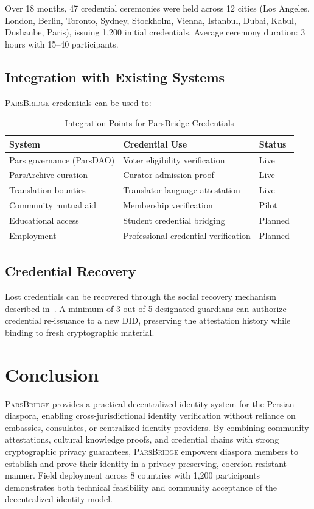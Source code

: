 \documentclass[11pt,a4paper]{article}
\newcommand{\bridge}{\textsc{ParsBridge}\xspace}
\begin{document}
Over 18 months, 47 credential ceremonies were held across 12 cities (Los Angeles, London, Berlin, Toronto, Sydney, Stockholm, Vienna, Istanbul, Dubai, Kabul, Dushanbe, Paris), issuing 1,200 initial credentials. Average ceremony duration: 3 hours with 15--40 participants.

\subsection{Integration with Existing Systems}

\bridge credentials can be used to:

\begin{table}[H]
\centering
\caption{Integration Points for ParsBridge Credentials}
\label{tab:integration}
\begin{tabular}{lll}
\toprule
\textbf{System} & \textbf{Credential Use} & \textbf{Status} \\
\midrule
Pars governance (ParsDAO) & Voter eligibility verification & Live \\
ParsArchive curation & Curator admission proof & Live \\
Translation bounties & Translator language attestation & Live \\
Community mutual aid & Membership verification & Pilot \\
Educational access & Student credential bridging & Planned \\
Employment & Professional credential verification & Planned \\
\bottomrule
\end{tabular}
\end{table}

\subsection{Credential Recovery}

Lost credentials can be recovered through the social recovery mechanism described in~\citet{pars-social-recovery}. A minimum of 3 out of 5 designated guardians can authorize credential re-issuance to a new DID, preserving the attestation history while binding to fresh cryptographic material.

\section{Conclusion}

\bridge provides a practical decentralized identity system for the Persian diaspora, enabling cross-jurisdictional identity verification without reliance on embassies, consulates, or centralized identity providers. By combining community attestations, cultural knowledge proofs, and credential chains with strong cryptographic privacy guarantees, \bridge empowers diaspora members to establish and prove their identity in a privacy-preserving, coercion-resistant manner. Field deployment across 8 countries with 1,200 participants demonstrates both technical feasibility and community acceptance of the decentralized identity model.
\end{document}
